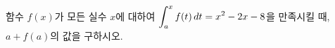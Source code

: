 함수 $f(x)$가 모든 실수 $x$에 대하여 $\displaystyle\int_{a}^{x}f(t)\mkern3mu dt=x^2-2x-8$을 만족시킬 때, $a+f(a)$의 값을 구하시오. 
